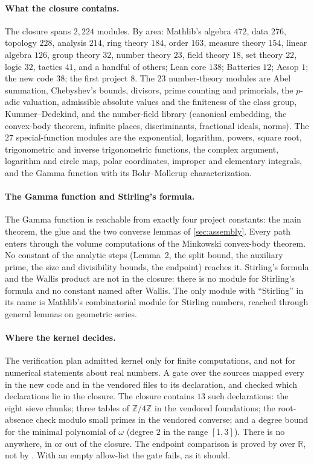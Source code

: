 \documentclass[11pt]{article}
\theoremstyle{definition}
\newcommand{\R}{\mathbb{R}}
\newcommand{\Z}{\mathbb{Z}}
\begin{document}
\paragraph{What the closure contains.} The closure spans $2{,}224$ modules. By area: Mathlib's algebra $472$, data $276$, topology $228$, analysis $214$, ring theory $184$, order $163$, measure theory $154$, linear algebra $126$, group theory $32$, number theory $23$, field theory $18$, set theory $22$, logic $32$, tactics $41$, and a handful of others; Lean core $138$; Batteries $12$; Aesop $1$; the new code $38$; the first project $8$. The $23$ number-theory modules are Abel summation, Chebyshev's bounds, divisors, prime counting and primorials, the $p$-adic valuation, admissible absolute values and the finiteness of the class group, Kummer--Dedekind, and the number-field library (canonical embedding, the convex-body theorem, infinite places, discriminants, fractional ideals, norms). The $27$ special-function modules are the exponential, logarithm, powers, square root, trigonometric and inverse trigonometric functions, the complex argument, logarithm and circle map, polar coordinates, improper and elementary integrals, and the Gamma function with its Bohr--Mollerup characterization.

\paragraph{The Gamma function and Stirling's formula.} The Gamma function is reachable from exactly four project constants: the main theorem, the glue and the two converse lemmas of \cref{sec:assembly}. Every path enters through the volume computations of the Minkowski convex-body theorem. No constant of the analytic steps (Lemma~2, the split bound, the auxiliary prime, the size and divisibility bounds, the endpoint) reaches it. Stirling's formula and the Wallis product are not in the closure: there is no module for Stirling's formula and no constant named after Wallis. The only module with ``Stirling'' in its name is Mathlib's combinatorial module for Stirling numbers, reached through general lemmas on geometric series.

\paragraph{Where the kernel decides.} The verification plan admitted kernel  only for finite computations, and not for numerical statements about real numbers. A gate over the sources mapped every  in the new code and in the vendored files to its declaration, and checked which declarations lie in the closure. The closure contains $13$ such declarations: the eight sieve chunks; three tables of $\Z/4\Z$ in the vendored foundations; the root-absence check modulo small primes in the vendored converse; and a degree bound for the minimal polynomial of $\omega$ (degree $2$ in the range $[1,3]$). There is no  anywhere, in or out of the closure. The endpoint comparison is proved by  over $\R$, not by . With an empty allow-list the gate fails, as it should.
\end{document}

